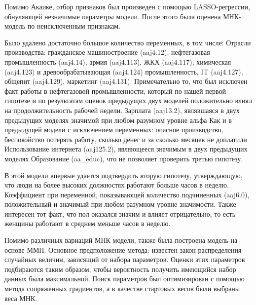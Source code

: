 \documentclass[12pt, a4paper]{article}
\begin{document}
{		Помимо Акаике, отбор признаков был произведен с помощью LASSO-регрессии, обнуляющей незначимые параметры модели. После этого была оценена МНК-модель по неисключенным признакам. 
		
		Было удалено достаточно большое количество переменных, в том числе:
		Отрасли производства: гражданское машиностроение (aaj4.12), нефтегазовая промышленность (aaj4.14), армия (aaj4.113), ЖКХ (aaj4.117), химическая (aaj4.123) и древообрабатывающая  (aaj4.124) промышленность, IT (aaj4.127), общепит (aaj4.129), маркетинг (aaj4.131). Примечательно то, что был исключен факт работы в нефтегазовой промышленности, который по нашей первой гипотезе и по результатам оценок предыдущих двух моделей положительно влиял на продолжительность рабочей недели. 
		Зарплата (aaj13.2), являвшаяся в двух предыдущих моделях значимой при любом разумном уровне альфа
		Как и в предыдущей модели с исключением переменных: опасное производство, беспокойство потерять работу, сколько денег и за сколько месяцев не доплатили
		Использование интернета (aaj125.2), являющееся значимым в двух предыдущих моделях
		Образование (aa\_educ), что не позволяет проверить третью гипотезу.
		
		
		В этой модели впервые удается подтвердить вторую гипотезу, утверждающую, что люди на более высоких должностях работают больше часов в неделю. Коэффициент при переменной, показывающей количество подчиненных (aaj6.0), положительный и значимый при любом разумном уровне значимости. 
		Также интересен тот факт, что пол оказался значим и влияет отрицательно, то есть женщины работают в среднем меньше часов в неделю.
		
		Помимо различных вариаций МНК модели, также была построена модель на основе ММП. Основное предположение метода: известен закон распределения случайных величин, зависящий от набора параметров. Оценки этих параметров подбираются таким образом, чтобы вероятность получить имеющийся набор данных была максимальной. Поиск параметров был оптимизирован с помощью метода сопряженных градиентов, а в качестве стартовых весов были выбраны веса МНК.
		
}
\end{document}
